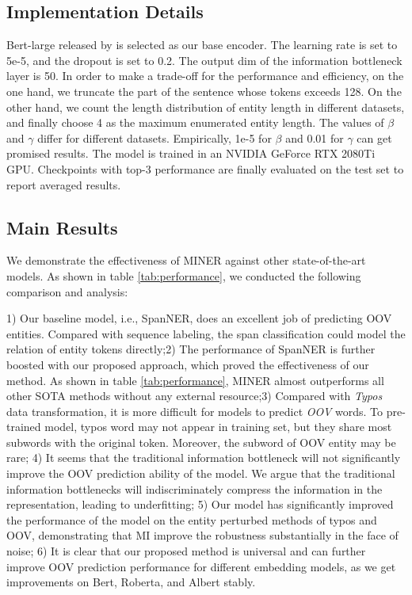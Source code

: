 \documentclass[11pt]{article}
\begin{document}
\subsection{Implementation Details}
Bert-large released by \citet{devlin2018bert} is selected as our base encoder. The learning rate is set to 5e-5, and the dropout is set to 0.2. The output dim of the information bottleneck layer is 50. In order to make a trade-off for the performance and efficiency, on the one hand, we truncate the part of the sentence whose tokens exceeds 128. On the other hand, we count the length distribution of entity length in different datasets, and finally choose 4 as the maximum enumerated entity length. The values of $\beta$ and $\gamma$ differ for different datasets. Empirically, 1e-5 for $\beta$ and 0.01 for $\gamma$ can get promised results. The model is trained in an NVIDIA GeForce RTX 2080Ti GPU. Checkpoints with top-3 performance are finally evaluated on the test set to report averaged results.


\subsection{Main Results}
We demonstrate the effectiveness of MINER against other state-of-the-art models. As shown in table \ref{tab:performance}, we conducted the following comparison and analysis:



1) Our baseline model, i.e., SpanNER, does an excellent job of predicting OOV entities. Compared with sequence labeling, the span classification could model the relation of entity tokens directly;2) The performance of SpanNER is further boosted with our proposed approach, which proved the effectiveness of our method. As shown in table \ref{tab:performance}, MINER almost outperforms all other SOTA methods without any external resource;3) Compared with \textit{Typos} data transformation, it is more difficult for models to predict \textit{OOV} words. To pre-trained model, typos word may not appear in training set, but they share most subwords with the original token. Moreover, the subword of OOV entity may be rare; 4) It seems that the traditional information bottleneck will not significantly improve the OOV prediction ability of the model. We argue that the traditional information bottlenecks will indiscriminately compress the information in the representation, leading to underfitting; 5) Our model has significantly improved the performance of the model on the entity perturbed methods of typos and OOV, demonstrating that MI improve the robustness substantially in the face of noise; 
6) It is clear that our proposed method is universal and can further improve OOV prediction performance for different embedding models, as we get improvements on Bert, Roberta, and Albert stably.
\end{document}
